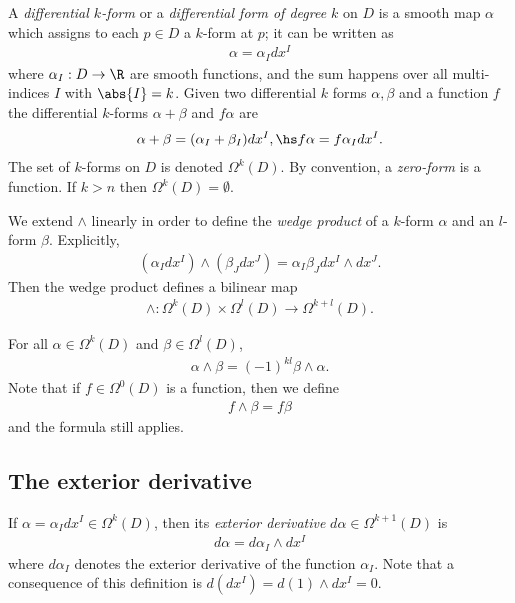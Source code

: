 \documentclass{article}
\begin{document}
\begin{definition}
	A \emph{differential $k$-form} or a \emph{differential form of degree $k$} on $D$ is a
	smooth map $\alpha$ which assigns to each $p\in D$ a $k$-form at $p$; it can be written as
	\begin{align*}
		\alpha=\alpha_Idx^I
	\end{align*}
	where $\alpha_I:D\to\R$ are smooth functions, and the sum happens over all multi-indices
	$I$ with $\abs{I}=k$. Given two differential $k$ forms $\alpha,\beta$ and a function $f$
	the differential $k$-forms $\alpha+\beta$ and $f\alpha$ are
	\begin{align*}
		\alpha + \beta = (\alpha_I + \beta_I)dx^I, \hs f\alpha = f\alpha_I dx^I.
	\end{align*}
	The set of $k$-forms on $D$ is denoted $\Omega^k(D)$. By convention, a \emph{zero-form}
	is a function. If $k>n$ then $\Omega^k(D)=\emptyset$.
\end{definition}

\begin{definition}
	We extend $\wedge$ linearly in order to define the \emph{wedge product} of a $k$-form $\alpha$
	and an $l$-form $\beta$. Explicitly,
	\begin{align*}
		(\alpha_Idx^I) \wedge (\beta_Jdx^J) = \alpha_I\beta_Jdx^I\wedge dx^J.
	\end{align*}
	Then the wedge product defines a bilinear map
	\begin{align*}
		\wedge : \Omega^k(D) \times \Omega^l(D) \to \Omega^{k+l} (D).
	\end{align*}
\end{definition}

\begin{proposition}
	For all $\alpha\in\Omega^k(D)$ and $\beta\in\Omega^l(D)$,
	\begin{align*}
		\alpha\wedge\beta = (-1)^{kl} \beta \wedge \alpha.
	\end{align*}
	Note that if $f\in\Omega^0(D)$ is a function, then we define
	\begin{align*}
		f\wedge\beta = f\beta
	\end{align*}
	and the formula still applies.
\end{proposition}

\subsection{The exterior derivative}

\begin{definition}
	If $\alpha=\alpha_Idx^I\in\Omega^k(D)$, then its \emph{exterior derivative} $d\alpha\in\Omega^{k+1}(D)$
	is
	\begin{align*}
		d\alpha = d\alpha_I \wedge dx^I
	\end{align*}
	where $d\alpha_I$ denotes the exterior derivative of the function $\alpha_I$. Note that
	a consequence of this definition is $d(dx^I) = d(1)\wedge dx^I=0$.
\end{definition}
\end{document}
